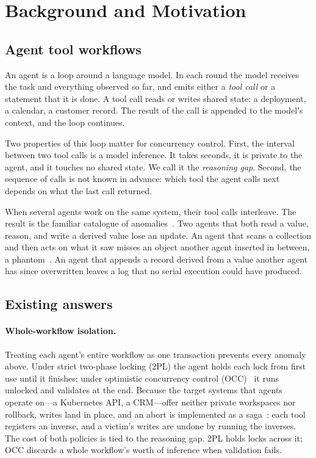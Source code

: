 \section{Background and Motivation}
\label{sec:background}

\subsection{Agent tool workflows}

An agent is a loop around a language model. In each round the model receives
the task and everything observed so far, and emits either a \emph{tool call}
or a statement that it is done. A tool call reads or writes shared state: a
deployment, a calendar, a customer record. The result of the call is appended
to the model's context, and the loop continues.

Two properties of this loop matter for concurrency control. First, the
interval between two tool calls is a model inference. It takes seconds, it is
private to the agent, and it touches no shared state. We call it the
\emph{reasoning gap}. Second, the sequence of calls is not known in advance:
which tool the agent calls next depends on what the last call returned.

When several agents work on the same system, their tool calls interleave. The
result is the familiar catalogue of anomalies~\cite{bernstein1987}. Two agents
that both read a value, reason, and write a derived value lose an update. An
agent that scans a collection and then acts on what it saw misses an object
another agent inserted in between, a phantom~\cite{eswaran1976}. An agent that
appends a record derived from a value another agent has since overwritten
leaves a log that no serial execution could have produced.

\subsection{Existing answers}

\paragraph{Whole-workflow isolation.} Treating each agent's entire workflow
as one transaction prevents every anomaly above. Under strict two-phase
locking (2PL) the agent holds each lock from first use until it finishes;
under optimistic concurrency control (OCC)~\cite{kung1981occ} it runs
unlocked and validates at the end. Because the target systems that agents
operate on---a Kubernetes API, a CRM---offer neither private workspaces nor
rollback, writes land in place, and an abort is implemented as a
saga~\cite{garciamolina1987sagas}: each tool registers an inverse, and a
victim's writes are undone by running the inverses. The cost of both policies
is tied to the reasoning gap. 2PL holds locks across it; OCC discards a whole
workflow's worth of inference when validation fails.

